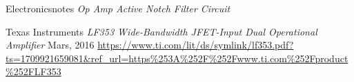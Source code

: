     Electronicsnotes
    \emph{Op Amp Active Notch Filter Circuit}

    Texas Instruments
    \emph{LF353 Wide-Bandwidth JFET-Input Dual Operational Amplifier}
    Mars, 2016
    \url{https://www.ti.com/lit/ds/symlink/lf353.pdf?ts=1709921659081&ref_url=https\%253A\%252F\%252Fwww.ti.com\%252Fproduct\%252FLF353}
